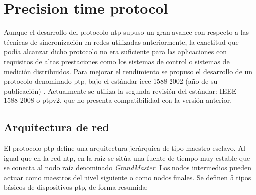 \section{Precision time protocol}

Aunque el desarrollo del protocolo \gls{ntp} supuso un gran avance con respecto 
a las técnicas de sincronización en redes utilizadas anteriormente, la 
exactitud que podía alcanzar dicho protocolo no era suficiente para las 
aplicaciones con requisitos de altas prestaciones como los sistemas de control 
o sistemas de medición distribuidos. Para mejorar el rendimiento se propuso el 
desarrollo de un protocolo denominado \acrlong{ptp}, bajo el estándar 
\acrshort{ieee} 1588-2002 (año de su publicación) \cite{IEEE1588-2008}. 
Actualmente se utiliza la segunda revisión del estándar: IEEE 1588-2008 o 
\gls{ptp}v2, que no presenta compatibilidad con la versión anterior.

\subsection{Arquitectura de red}

El protocolo \gls{ptp} define una arquitectura jerárquica de tipo 
maestro-esclavo. Al igual que en la red \gls{ntp}, en la raíz se sitúa una 
fuente de tiempo muy estable que se conecta al nodo raíz denominado 
\textit{GrandMaster}. Los nodos intermedios pueden actuar como maestros del 
nivel siguiente o como nodos finales. Se definen 5 tipos básicos de 
dispositivos \gls{ptp}, de forma resumida:

